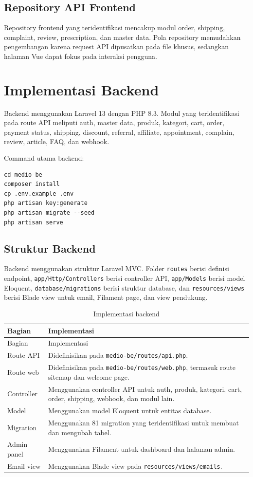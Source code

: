 \documentclass[12pt,a4paper]{report}
\begin{document}
\subsection{Repository API Frontend}
Repository frontend yang teridentifikasi mencakup modul order, shipping, complaint, review, prescription, dan master data. Pola repository memudahkan pengembangan karena request API dipusatkan pada file khusus, sedangkan halaman Vue dapat fokus pada interaksi pengguna.

\section{Implementasi Backend}
Backend menggunakan Laravel 13 dengan PHP 8.3. Modul yang teridentifikasi pada route API meliputi auth, master data, produk, kategori, cart, order, payment status, shipping, discount, referral, affiliate, appointment, complain, review, article, FAQ, dan webhook.

Command utama backend:
\begin{verbatim}
cd medio-be
composer install
cp .env.example .env
php artisan key:generate
php artisan migrate --seed
php artisan serve
\end{verbatim}

\subsection{Struktur Backend}
Backend menggunakan struktur Laravel MVC. Folder \texttt{routes} berisi definisi endpoint, \texttt{app/Http/Controllers} berisi controller API, \texttt{app/Models} berisi model Eloquent, \texttt{database/migrations} berisi struktur database, dan \texttt{resources/views} berisi Blade view untuk email, Filament page, dan view pendukung.

\begin{longtable}{p{}p{}}
\caption{Implementasi backend}\\
\toprule
Bagian & Implementasi \\
\midrule
\endfirsthead
\toprule
Bagian & Implementasi \\
\midrule
\endhead
Route API & Didefinisikan pada \texttt{medio-be/routes/api.php}. \\
Route web & Didefinisikan pada \texttt{medio-be/routes/web.php}, termasuk route sitemap dan welcome page. \\
Controller & Menggunakan controller API untuk auth, produk, kategori, cart, order, shipping, webhook, dan modul lain. \\
Model & Menggunakan model Eloquent untuk entitas database. \\
Migration & Menggunakan 81 migration yang teridentifikasi untuk membuat dan mengubah tabel. \\
Admin panel & Menggunakan Filament untuk dashboard dan halaman admin. \\
Email view & Menggunakan Blade view pada \texttt{resources/views/emails}. \\
\bottomrule
\end{longtable}
\end{document}
